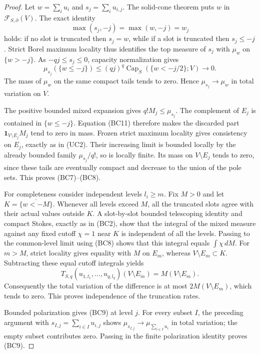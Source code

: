 \begin{proof}
Let $w=\sum_i u_i$ and $s_j=\sum_i u_{i,j}$. The solid-cone
theorem puts $w$ in $\mathcal F_{S,\partial}(V)$. The exact identity
\[
                      \max(s_j,-j)=\max(w,-j)=w_j
 \tag{BC10}
\]
holds: if no slot is truncated then $s_j=w$, while if a slot is
truncated then $s_j\leq-j$. Strict Borel maximum locality thus
identifies the top measure of $s_j$ with $\mu_w$ on $\{w>-j\}$.
As $-qj\leq s_j\leq0$, capacity normalization gives
\[
 \mu_{s_j}(\{w\leq-j\})
       \leq(qj)^q\operatorname{Cap}_S(\{w<-j/2\};V)
                                     \longrightarrow0.
 \tag{BC11}
\]
The mass of $\mu_w$ on the same compact tails tends to zero.
Hence $\mu_{s_j}\to\mu_w$ in total variation on $V$.

The positive bounded mixed expansion gives $q!M_j\leq\mu_{s_j}$.
The complement of $E_j$ is contained in $\{w\leq-j\}$.
Equation (BC11) therefore makes the discarded part
$\mathbf1_{V\setminus E_j}M_j$ tend to zero in mass. Frozen
strict maximum locality gives consistency on $E_j$, exactly as
in (UC2). Their increasing limit is bounded locally by the
already bounded family $\mu_{s_j}/q!$, so is locally finite.
Its mass on $V\setminus E_j$ tends to zero, since these tails
are eventually compact and decrease to the union of the pole sets.
This proves (BC7)--(BC8).

For completeness consider independent levels $l_i\geq m$. Fix
$M>0$ and let $K=\overline{\{w<-M\}}$. Whenever all levels
exceed $M$, all the truncated slots agree with their actual values
outside $K$. A slot-by-slot bounded telescoping identity and
compact Stokes, exactly as in (BC2), show that the integral of
the mixed measure against any fixed cutoff $\chi=1$ near $K$
is independent of all the levels. Passing to the common-level
limit using (BC8) shows that this integral equals $\int\chi\,dM$.
For $m>M$, strict locality gives equality with $M$ on $E_m$,
whereas $V\setminus E_m\subset K$. Subtracting these equal
cutoff integrals yields
\[
 T_{S,q}(u_{1,l_1},\ldots,u_{q,l_q})(V\setminus E_m)
                            =M(V\setminus E_m).
\]
Consequently the total variation of the difference is at most
$2M(V\setminus E_m)$, which tends to zero. This proves independence
of the truncation rates.

Bounded polarization gives (BC9) at level $j$. For every subset
$I$, the preceding argument with $s_{I,j}=\sum_{i\in I}u_{i,j}$
shows $\mu_{s_{I,j}}\to\mu_{\sum_{i\in I}u_i}$ in total
variation; the empty subset contributes zero. Passing in the finite
polarization identity proves (BC9).


\end{proof}
